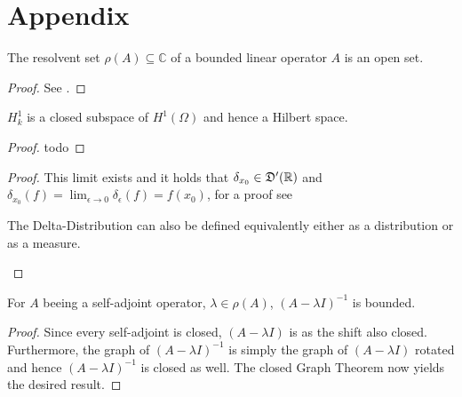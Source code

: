 \chapter*{Appendix}  



\begin{atheorem}
	The resolvent set $\rho(A) \subseteq \mathbb{C}$ of a bounded linear operator $A$ is an open set.
	
	\begin{proof}
		See \cite[page 259]{werner2006funkana}.
	\end{proof}
\end{atheorem}

\begin{atheorem} \label{h1kclosed}
	$H^{1}_{k}$ is a closed subspace of $H^{1}(\Omega)$ and hence a Hilbert space.

	\begin{proof}
		todo %
	\end{proof}
\end{atheorem}

\begin{atheorem} \label{athem:delta}
	
	\begin{proof}
		 	This limit exists and it holds that $\delta_{x_{0}} \in \mathfrak{D}'(\mathbb{R})$ and $\delta_{x_{0}}(f) = \lim_{\epsilon \rightarrow 0} \delta_{\epsilon}(f) = f(x_{0})$, for a proof see
 		\begin{remark}
 		 The Delta-Distribution can also be defined equivalently either as a 	distribution or as a measure.
 		\end{remark}
	\end{proof}
\end{atheorem}

\begin{atheorem}
	For $A$ beeing a self-adjoint operator, $\lambda \in \rho(A)$, $(A - \lambda I)^{-1}$ is bounded.
	
	\begin{proof}
		Since every self-adjoint is closed, $(A - \lambda I)$ is as the shift also closed. Furthermore, the graph of $(A - \lambda I)^{-1}$ is simply the graph of $(A - \lambda I)$ rotated and hence $(A - \lambda I)^{-1}$ is closed as well. The closed Graph Theorem now yields the desired result.
	\end{proof}
\end{atheorem}

